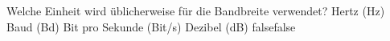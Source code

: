     {Welche Einheit wird üblicherweise für die Bandbreite verwendet?}
    {Hertz (Hz)}
    {Baud (Bd)}
    {Bit pro Sekunde (Bit/s)}
    {Dezibel (dB)}
    {false}{false}